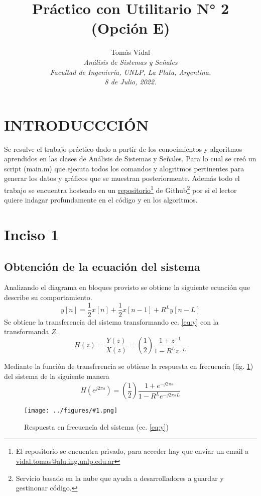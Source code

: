 \documentclass[letterpaper, 10 pt, conference]{ieeeconf}  %
\title{\LARGE \bf Pr\'actico con Utilitario N° 2 (Opción E)}
\author{
  Tom\'as Vidal\\
  {\it An\'alisis de Sistemas y Se\~{n}ales}\\
  {\it Facultad de Ingenier\'ia, UNLP, La Plata, Argentina.}\\
  {\it 8 de Julio, 2022.}
}                                            %
\newcommand{\image}[2] {
  \begin{figure}[H]
    \centering
    \texttt{[image: ../figures/\#1.png]}
    \caption{#2}
    \label{fig:#1}
  \end{figure}
}
\begin{document}
\maketitle
\thispagestyle{empty}
\pagestyle{empty}

\section{INTRODUCCCI\'ON}
Se resulve el trabajo pr\'actico dado a partir de los conocimientos y algoritmos aprendidos en las clases de Análisis de Sistemas y Se\~{n}ales. Para lo cual se cre\'o un script (main.m) que ejecuta todos los comandos y alogritmos pertinentes para generar los datos y gr\'aficos que se muestran posteriormente. Adem\'as todo el trabajo se encuentra hosteado en un \href{https://github.com/TomiVidal99/asys_tpn2}{repositorio}\footnote{El repositorio se encuentra privado, para acceder hay que enviar un email a \href{mailto:vidal.tomas@alu.ing.unlp.edu.ar}{vidal.tomas@alu.ing.unlp.edu.ar}} de Github\footnote{Servicio basado en la nube que ayuda a desarrolladores a guardar y gestinonar c\'odigo.} por si el lector quiere indagar profundamente en el c\'odigo y en los algoritmos.


\section{Inciso 1}

\subsection{Obtenci\'on de la ecuaci\'on del sistema}
Analizando el diagrama en bloques provisto se obtiene la siguiente ecuaci\'on que describe su comportamiento.
\begin{equation} \label{eq:y}
  y[n] = \frac{1}{2}x[n] + \frac{1}{2}x[n-1] + R^{L}y[n-L]
\end{equation}
Se obtiene la transferencia del sistema transformando ec. \ref{eq:y} con la transformanda $Z$.
\begin{equation} \label{eq:Hz}
  H(z) = \frac{Y(z)}{X(z)} = (\frac{1}{2})\frac{1 + z^{-1}}{1 - R^{L}z^{-L}}
\end{equation}

Mediante la funci\'on de transferencia se obtiene la respuesta en frecuencia (fig. \ref{fig:HfreqResp}) del sistema de la siguiente manera
\begin{equation*}
  H(e^{j2{\pi}s}) = (\frac{1}{2})\frac{1 + {e^{-j2{\pi}s}}}{1 - R^{L}{e^{-j2{\pi}sL}}}
\end{equation*}
\image{HfreqResp}{Respuesta en frecuencia del sistema (ec. \ref{eq:y})}
\end{document}
